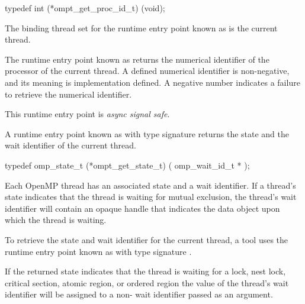 \format

\begin{ccppspecific}
\begin{omptInquiry}
typedef int (*ompt_get_proc_id_t) (void);
\end{omptInquiry}
\end{ccppspecific}


\binding

The binding thread set for
the runtime entry point known as 
is the current thread.

\descr

The runtime entry point known as
 returns the numerical identifier
of the processor of the current thread.
A defined numerical identifier is non-negative, and
its meaning is implementation defined.
A negative number indicates a failure to retrieve the numerical identifier.

This runtime entry point is \emph{async signal safe}.






\label{sec:ompt_get_state_t}
\label{sec:ompt_get_state}

\summary
A runtime entry point known as 
with type signature 
returns the state and the wait identifier of the
current thread.

\format
\begin{ccppspecific}
\begin{omptInquiry}
typedef omp_state_t (*ompt_get_state_t) (
  omp_wait_id_t *
);
\end{omptInquiry}
\end{ccppspecific}

\descr

Each OpenMP thread has an associated state and a wait identifier.  If
a thread's state indicates that the thread is waiting for mutual
exclusion, the thread's wait identifier will contain an opaque handle
that indicates the data object upon which the thread is waiting.

To retrieve the state and wait identifier for the current thread,
a tool uses the runtime entry point known as
 with type signature .

If the returned state indicates that the thread is waiting for a
lock, nest lock, critical section, atomic region, or ordered region
the value of the thread's wait identifier will be assigned to a
non- wait identifier passed as an argument.

